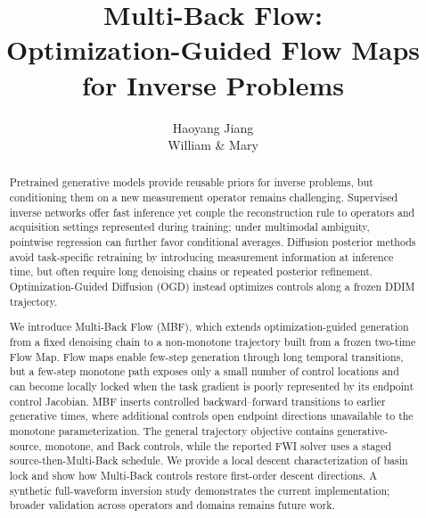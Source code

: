 \documentclass[10pt,twocolumn]{article}
\title{Multi-Back Flow:\\Optimization-Guided Flow Maps for Inverse Problems}
\author{Haoyang Jiang\\William \& Mary}
\date{}
\newcommand{\method}{Multi-Back Flow}
\begin{document}
\maketitle

\begin{abstract}
Pretrained generative models provide reusable priors for inverse problems, but conditioning them on a new measurement operator remains challenging. Supervised inverse networks offer fast inference yet couple the reconstruction rule to operators and acquisition settings represented during training; under multimodal ambiguity, pointwise regression can further favor conditional averages. Diffusion posterior methods avoid task-specific retraining by introducing measurement information at inference time, but often require long denoising chains or repeated posterior refinement. Optimization-Guided Diffusion (OGD) instead optimizes controls along a frozen DDIM trajectory.

We introduce \method{} (MBF), which extends optimization-guided generation from a fixed denoising chain to a non-monotone trajectory built from a frozen two-time Flow Map. Flow maps enable few-step generation through long temporal transitions, but a few-step monotone path exposes only a small number of control locations and can become locally locked when the task gradient is poorly represented by its endpoint control Jacobian. MBF inserts controlled backward--forward transitions to earlier generative times, where additional controls open endpoint directions unavailable to the monotone parameterization. The general trajectory objective contains generative-source, monotone, and Back controls, while the reported FWI solver uses a staged source-then-Multi-Back schedule. We provide a local descent characterization of basin lock and show how Multi-Back controls restore first-order descent directions. A synthetic full-waveform inversion study demonstrates the current implementation; broader validation across operators and domains remains future work.
\end{abstract}
\end{document}
